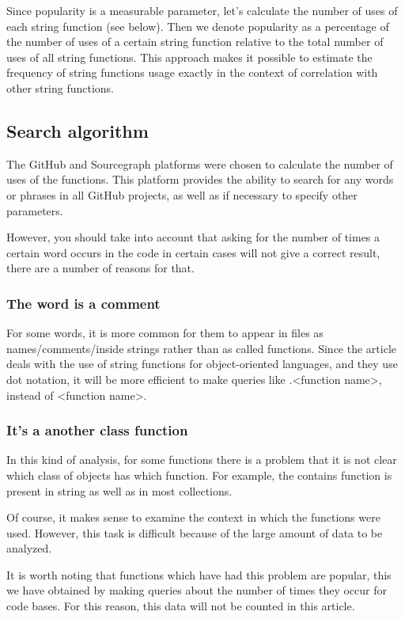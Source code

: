 \documentclass[anonymous,sigplan,review,11pt,nonacm,natbib=false]{acmart}
\begin{document}
    Since popularity is a measurable parameter, let's calculate the number of uses of each string function (see below). Then we denote popularity as a percentage of the number of uses of a certain string function relative to the total number of uses of all string functions. This approach makes it possible to estimate the frequency of string functions usage exactly in the context of correlation with other string functions.

    \subsection{Search algorithm}

    The GitHub and Sourcegraph platforms were chosen to calculate the number of uses of the functions. This platform provides the ability to search for any words or phrases in all GitHub projects, as well as if necessary to specify other parameters.

    However, you should take into account that asking for the number of times a certain word occurs in the code in certain cases will not give a correct result, there are a number of reasons for that.

    \subsubsection{The word is a comment} \hl{}

    For some words, it is more common for them to appear in files as names/comments/inside strings rather than as called functions. Since the article deals with the use of string functions for object-oriented languages, and they use dot notation, it will be more efficient to make queries like .<function name>, instead of <function name>.

    \subsubsection{It's a another class function} \hl{}

    In this kind of analysis, for some functions there is a problem that it is not clear which class of objects has which function. For example, the contains function is present in string as well as in most collections.

    Of course, it makes sense to examine the context in which the functions were used. However, this task is difficult because of the large amount of data to be analyzed.

    It is worth noting that functions which have had this problem are popular, this we have obtained by making queries about the number of times they occur for code bases. For this reason, this data will not be counted in this article.
\end{document}
